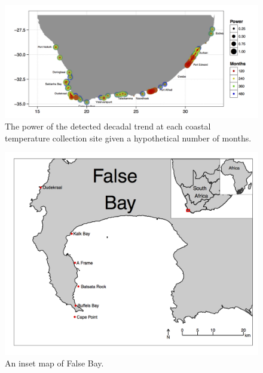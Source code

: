 \documentclass[]{book}
\theoremstyle{definition}
\theoremstyle{definition}
\theoremstyle{definition}
\theoremstyle{remark}
\begin{document}
\begin{figure}

{\centering \includegraphics[width=1\linewidth]{figures/sw-fig-7-1} 

}

\caption{The power of the detected decadal trend at each coastal temperature collection site given a hypothetical number of months.}\label{fig:example13}
\end{figure}

\begin{figure}

{\centering \includegraphics[width=1\linewidth]{figures/false_bay_inset_map_labels2} 

}

\caption{An inset map of False Bay.}\label{fig:example5}
\end{figure}
\end{document}
